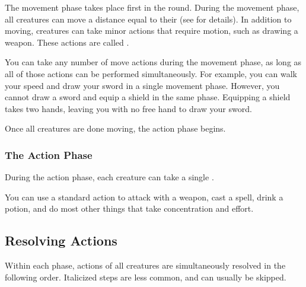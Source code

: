             The movement phase takes place first in the round.
            During the movement phase, all creatures can move a distance equal to their  (see  for details).
            In addition to moving, creatures can take minor actions that require motion, such as drawing a weapon.
            These actions are called .

            You can take any number of move actions during the movement phase, as long as all of those actions can be performed simultaneously.
            For example, you can walk your speed and draw your sword in a single movement phase.
            However, you cannot draw a sword and equip a shield in the same phase.
            Equipping a shield takes two hands, leaving you with no free hand to draw your sword.

            Once all creatures are done moving, the action phase begins.

        \subsubsection{The Action Phase}\label{The Action Phase}

            During the action phase, each creature can take a single .

             You can use a standard action to attack with a weapon, cast a spell, drink a potion, and do most other things that take concentration and effort.

    \subsection{Resolving Actions}\label{Resolving Actions}

        Within each phase, actions of all creatures are simultaneously resolved in the following order.
        Italicized steps are less common, and can usually be skipped.

